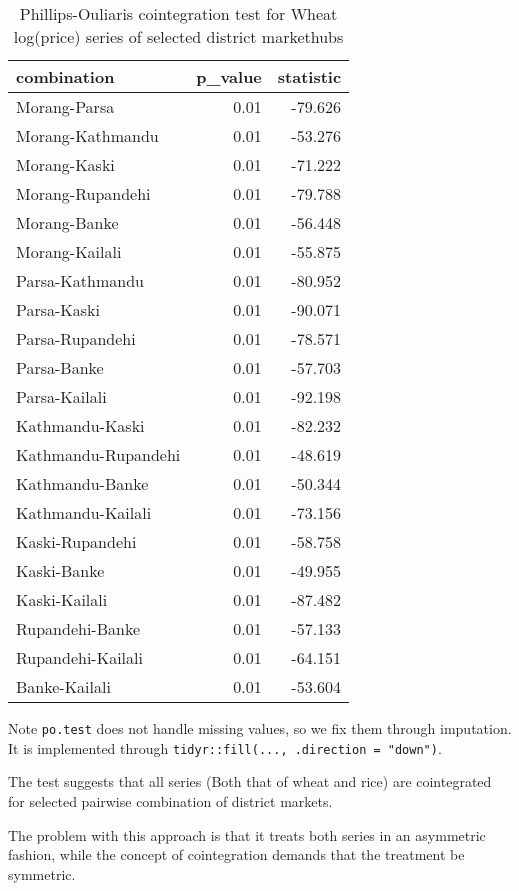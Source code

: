 \documentclass[
  12pt,
]{article}
\begin{document}
\begin{longtable}[t]{lrr}
\caption{\label{tab:pairwise-phillips-cointegration}Phillips-Ouliaris cointegration test for Wheat log(price) series of selected district markethubs}\\
\toprule
combination & p\_value & statistic\\
\midrule
Morang-Parsa & 0.01 & -79.626\\
Morang-Kathmandu & 0.01 & -53.276\\
Morang-Kaski & 0.01 & -71.222\\
Morang-Rupandehi & 0.01 & -79.788\\
Morang-Banke & 0.01 & -56.448\\
\addlinespace
Morang-Kailali & 0.01 & -55.875\\
Parsa-Kathmandu & 0.01 & -80.952\\
Parsa-Kaski & 0.01 & -90.071\\
Parsa-Rupandehi & 0.01 & -78.571\\
Parsa-Banke & 0.01 & -57.703\\
\addlinespace
Parsa-Kailali & 0.01 & -92.198\\
Kathmandu-Kaski & 0.01 & -82.232\\
Kathmandu-Rupandehi & 0.01 & -48.619\\
Kathmandu-Banke & 0.01 & -50.344\\
Kathmandu-Kailali & 0.01 & -73.156\\
\addlinespace
Kaski-Rupandehi & 0.01 & -58.758\\
Kaski-Banke & 0.01 & -49.955\\
Kaski-Kailali & 0.01 & -87.482\\
Rupandehi-Banke & 0.01 & -57.133\\
Rupandehi-Kailali & 0.01 & -64.151\\
\addlinespace
Banke-Kailali & 0.01 & -53.604\\
\bottomrule
\end{longtable}

Note \texttt{po.test} does not handle missing values, so we fix them through imputation. It is implemented through \texttt{tidyr::fill(...,\ .direction\ =\ "down")}.

The test suggests that all series (Both that of wheat and rice) are cointegrated for selected pairwise combination of district markets.

The problem with this approach is that it treats both series in an asymmetric fashion, while the concept of cointegration demands that the treatment be symmetric.
\end{document}
